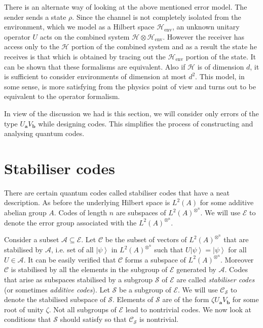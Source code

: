 \documentclass[11pt,twoside]{article}
\theoremstyle{definition}
\theoremstyle{remark}
\newcommand{\ket}[1]{\ensuremath{\left\vert #1 \right\rangle}}
\newcommand{\LN}[1]{\ensuremath{L^2\left(#1\right)^{\otimes^n}}}
\begin{document}
There is an alternate way of looking at the above mentioned error
model. The sender sends a state $\rho$. Since the channel is not
completely isolated from the environment, which we model as a Hilbert
space $\mathcal{H}_{\mathrm{env}}$, an unknown unitary operator $U$
acts on the combined system $\mathcal{H} \otimes
\mathcal{H}_{\mathrm{env}}$.  However the receiver has access only to
the $\mathcal{H}$ portion of the combined system and as a result the
state he receives is that which is obtained by tracing out the
$\mathcal{H}_{\mathrm{env}}$ portion of the state. It can be shown
that these formalisms are equivalent. Also if $\mathcal{H}$ is of
dimension $d$, it is sufficient to consider environments of dimension
at most $d^2$. This model, in some sense, is more satisfying from the
physics point of view and turns out to be equivalent to the operator
formalism.

In view of the discussion we had is this section, we will consider
only errors of the type $U_\mathbf{a}V_\mathbf{b}$ while designing
codes. This simplifies the process of constructing and analysing
quantum codes.

\section{Stabiliser codes}

There are certain quantum codes called stabiliser codes that have a
neat description. As before the underlying Hilbert space is $L^2(A)$
for some additive abelian group $A$. Codes of length $n$ are subspaces
of $\LN{A}$. We will use $\mathcal{E}$ to denote the error group
associated with the $\LN{A}$.

Consider a subset $\mathcal{A} \subseteq \mathcal{E}$. Let
$\mathcal{C}$ be the subset of vectors of $\LN{A}$ that are stabilised
by $\mathcal{A}$, i.e.  set of all $\ket{\psi}$ in $\LN{A}$ such that
$U \ket{\psi} = \ket{\psi}$ for all $U \in \mathcal{A}$. It can be
easily verified that $\mathcal{C}$ forms a subspace of $\LN{A}$.
Moreover $\mathcal{C}$ is stabilised by all the elements in the
subgroup of $\mathcal{E}$ generated by $\mathcal{A}$.  Codes that
arise as subspaces stabilised by a subgroup $\mathcal{S}$ of
$\mathcal{E}$ are called \emph{stabiliser codes} (or sometimes
\emph{additive codes}). Let $\mathcal{S}$ be a subgroup of
$\mathcal{E}$. We will use $\mathcal{C}_\mathcal{S}$ to denote the
stabilised subspace of $\mathcal{S}$.  Elements of $\mathcal{S}$ are
of the form $\zeta U_{\mathbf{a}} V_{\mathbf{b}}$ for some root of
unity $\zeta$. Not all subgroups of $\mathcal{E}$ lead to nontrivial
codes. We now look at conditions that $\mathcal{S}$ should satisfy so
that $\mathcal{C}_\mathcal{S}$ is nontrivial.
\end{document}
